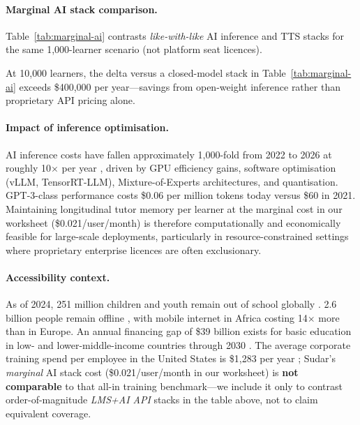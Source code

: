 \documentclass[10pt,twocolumn]{article}
\begin{document}
\paragraph{Marginal AI stack comparison.}
Table~\ref{tab:marginal-ai} contrasts \emph{like-with-like} AI inference
and TTS stacks for the same 1{,}000-learner scenario (not platform seat
licences).

\begin{table}[H]
\centering
\caption{Marginal AI infrastructure (1{,}000 learners, defined workload).}
\label{tab:marginal-ai}
\scriptsize
{}
\end{table}

At 10{,}000 learners, the delta versus a closed-model stack in
Table~\ref{tab:marginal-ai} exceeds \$400{,}000 per year---savings from
open-weight inference rather than proprietary API pricing alone.

\paragraph{Impact of inference optimisation.}
AI inference costs have fallen approximately 1,000-fold from 2022 to
2026 at roughly 10$\times$ per year \cite{a16z2024llmflation}, driven
by GPU efficiency gains, software optimisation (vLLM, TensorRT-LLM),
Mixture-of-Experts architectures, and quantisation. GPT-3-class
performance costs \$0.06 per million tokens today versus \$60 in 2021.
Maintaining longitudinal tutor memory per learner at the marginal cost
in our worksheet (\$0.021/user/month) is therefore computationally and
economically feasible for large-scale deployments, particularly in
resource-constrained settings where proprietary enterprise licences are
often exclusionary.

\paragraph{Accessibility context.}
As of 2024, 251 million children and youth remain out of school
globally \cite{unesco2024}. 2.6 billion people remain offline
\cite{itu2024}, with mobile internet in Africa costing 14$\times$ more
than in Europe. An annual financing gap of \$39 billion exists for
basic education in low- and lower-middle-income countries through 2030
\cite{unesco2024}. The average corporate training spend per employee in
the United States is \$1,283 per year \cite{statista2023}; Sudar's
\emph{marginal} AI stack cost (\$0.021/user/month in our worksheet) is
\textbf{not comparable} to that all-in training benchmark---we include
it only to contrast order-of-magnitude \emph{LMS+AI API} stacks in the
table above, not to claim equivalent coverage.
\end{document}
